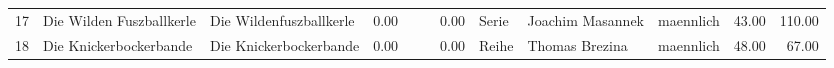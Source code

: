 \begin{table}
\begin{center}
{\begin{tabular}{rllrllrlllrr}
  17 & Die Wilden Fuszballkerle                                                                                                                                                                                                                                        & Die Wildenfuszballkerle                                                                                                                                                                                                                                         & 0.00 &                                                                                                                                                                                                                                                                 &                                                                                                                                                                                                                                                                 & 0.00 & Serie & Joachim Masannek                                                                                                                                                                                                                                                & maennlich & 43.00 & 110.00 \\ 
  18 & Die Knickerbockerbande                                                                                                                                                                                                                                          & Die Knickerbockerbande                                                                                                                                                                                                                                          & 0.00 &                                                                                                                                                                                                                                                                 &                                                                                                                                                                                                                                                                 & 0.00 & Reihe & Thomas Brezina                                                                                                                                                                                                                                                  & maennlich & 48.00 & 67.00 \\ 

\end{tabular}}
\end{center}
\end{table}

